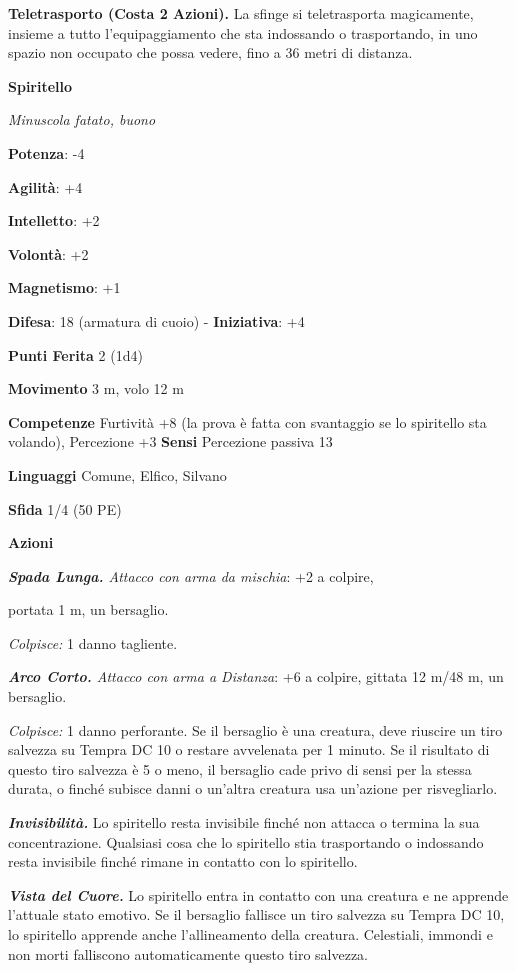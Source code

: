 \begin{multicols}{2}
\textbf{Teletrasporto (Costa 2 Azioni).} La sfinge si teletrasporta
magicamente, insieme a tutto l'equipaggiamento che sta indossando o
trasportando, in uno spazio non occupato che possa vedere, fino a 36
metri di distanza.

\textbf{Spiritello}

\emph{Minuscola fatato, buono}

\textbf{Potenza}: -4

\textbf{Agilità}: +4

\textbf{Intelletto}: +2

\textbf{Volontà}: +2

\textbf{Magnetismo}: +1

\textbf{Difesa}: 18 (armatura di cuoio) - \textbf{Iniziativa}: +4

\textbf{Punti Ferita} 2 (1d4)

\textbf{Movimento} 3 m, volo 12 m

\textbf{Competenze} Furtività +8 (la prova è fatta con svantaggio se lo
spiritello sta volando), Percezione +3 \textbf{Sensi} Percezione passiva
13

\textbf{Linguaggi} Comune, Elfico, Silvano

\textbf{Sfida} 1/4 (50 PE)\smallskip

\smallskip\textbf{Azioni}

\emph{\textbf{Spada Lunga.} Attacco con arma da mischia}: +2 a colpire,

portata 1 m, un bersaglio.

\emph{Colpisce:} 1 danno tagliente.

\emph{\textbf{Arco Corto.} Attacco con arma a Distanza}: +6 a colpire,
gittata 12 m/48 m, un bersaglio.

\emph{Colpisce:} 1 danno perforante. Se il bersaglio è una creatura,
deve riuscire un tiro salvezza su Tempra DC 10 o restare
avvelenata per 1 minuto. Se il risultato di questo tiro salvezza è 5 o
meno, il bersaglio cade privo di sensi per la stessa durata, o finché
subisce danni o un'altra creatura usa un'azione per risvegliarlo.

\emph{\textbf{Invisibilità.}} Lo spiritello resta invisibile finché non
attacca o termina la sua concentrazione. Qualsiasi cosa che lo
spiritello stia trasportando o indossando resta invisibile finché rimane
in contatto con lo spiritello.

\emph{\textbf{Vista del Cuore.}} Lo spiritello entra in contatto con una
creatura e ne apprende l'attuale stato emotivo. Se il bersaglio fallisce
un tiro salvezza su Tempra DC 10, lo spiritello apprende anche
l'allineamento della creatura. Celestiali, immondi e non morti
falliscono automaticamente questo tiro salvezza.




\end{multicols}

